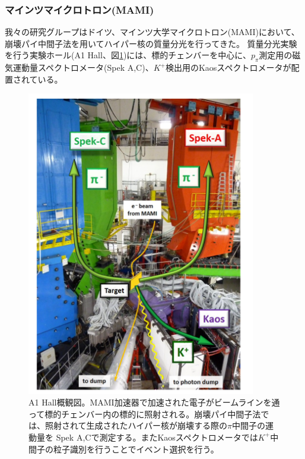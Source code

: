 \documentclass[a4paper,11pt,uplatex]{jsbook}
\begin{document}
\subsubsection{マインツマイクロトロン(MAMI)}
我々の研究グループはドイツ、マインツ大学マイクロトロン(MAMI)において、崩壊パイ中間子法を用いてハイパー核の質量分光を行ってきた。
質量分光実験を行う実験ホール(A1 Hall、図\ref{exp_hall})には、標的チェンバーを中心に、$p_\pi$測定用の磁気運動量スペクトロメータ(Spek A,C)、$K^+$検出用のKaosスペクトロメータが配置されている。
\begin{figure}[H]
  \centering
  \includegraphics[width=10cm]{image/1-HallA.png}
  \caption[MAMI実験ホール]{A1 Hall概観図。MAMI加速器で加速された電子がビームラインを通って標的チェンバー内の標的に照射される。崩壊パイ中間子法では、照射されて生成されたハイパー核が崩壊する際の$\pi$中間子の運動量を
  Spek A,Cで測定する。またKaosスペクトロメータでは$K^+$中間子の粒子識別を行うことでイベント選択を行う。\cite{esserObservation4Hyperhydrogen2015}}
  \label{exp_hall}
\end{figure}
\end{document}
